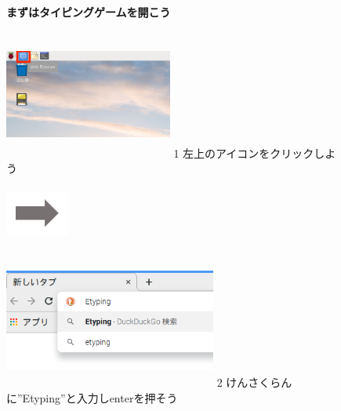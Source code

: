 \documentclass[a4paper,12pt]{jarticle}
\begin{document}
\begin{figure}[t]
  \centering


  {\centering
    \textbf{まずはタイピングゲームを開こう}
    \par}

  \centering

  \begin{minipage}{5.695cm}
    \includegraphics[width=5.523cm,height=4.249cm]{textbook-img071.png}
    1 左上のアイコンをクリックしよう
  \end{minipage}
  \includegraphics[width=2.094cm,height=1.771cm]{textbook-img084.png}
  \begin{minipage}{6.582cm}
    \includegraphics[width=6.985cm,height=4.479cm]{textbook-img083.png}
    2 けんさくらんに”Etyping”と入力しenterを押そう
  \end{minipage}



\end{figure}
\end{document}
